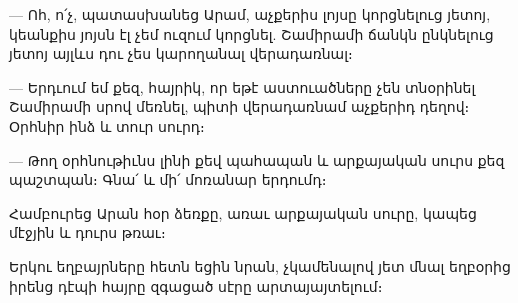 \documentclass{article}
\begin{document}
{— Ոհ, ո՛չ, պատասխանեց Արամ, աչքերիս լոյսը կորցնելուց յետոյ, կեանքիս յոյսն էլ չեմ ուզում կորցնել. Շամիրամի ճանկն ընկնելուց յետոյ այլևս դու չես կարողանալ վերադառնալ։

— Երդւում եմ քեզ, հայրիկ, որ եթէ աստուածները չեն տնօրինել Շամիրամի սրով մեռնել, պիտի վերադառնամ աչքերիդ դեղով։ Օրհնիր ինձ և տուր սուրդ։

— Թող օրհնութիւնս լինի քեվ պահապան և արքայական սուրս քեզ պաշտպան։ Գնա՛ և մի՛ մոռանար երդումդ։

Համբուրեց Արան հօր ձեռքը, առաւ արքայական սուրը, կապեց մէջյին և դուրս թռաւ։

Երկու եղբայրները հետն եցին նրան, չկամենալով յետ մնալ եղբօրից իրենց դէպի հայրը զգացած սէրը արտայայտելում։}
\clearpage
\section{}
\end{document}
